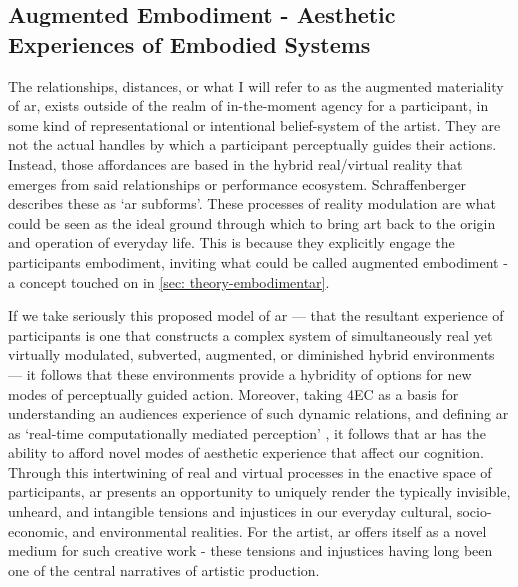 \subsection[Augmented Embodiment]{Augmented Embodiment - Aesthetic Experiences of Embodied Systems}\label{sec: discussion-medium-embodiment}
The relationships, distances, or what I will refer to as the augmented materiality of \gls{ar}, exists outside of the realm of in-the-moment agency for a participant, in some kind of representational or intentional belief-system of the artist. They are not the actual handles by which a participant perceptually guides their actions. Instead, those affordances are based in the hybrid real/virtual reality that emerges from said relationships or performance ecosystem. Schraffenberger describes these as `\gls{ar} subforms'. These processes of reality modulation are what could be seen as the ideal ground through which to bring art back to the origin and operation of everyday life. This is because they explicitly engage the participants embodiment, inviting what could be called augmented embodiment - a concept touched on in \autoref{sec: theory-embodimentar}.

If we take seriously this proposed model of \gls{ar} — that the resultant experience of participants is one that constructs a complex system of simultaneously real yet virtually modulated, subverted, augmented, or diminished hybrid environments — it follows that these environments provide a hybridity of options for new modes of perceptually guided action. Moreover, taking 4EC as a basis for understanding an audiences experience of such dynamic relations, and defining \gls{ar} as `real-time computationally mediated perception' \citep[]{chevalier2020}, it follows that \gls{ar} has the ability to afford novel modes of aesthetic experience that affect our cognition. Through this intertwining of real and virtual processes in the enactive space of participants, \gls{ar} presents an opportunity to uniquely render the typically invisible, unheard, and intangible tensions and injustices in our everyday cultural, socio-economic, and environmental realities. For the artist, \gls{ar} offers itself as a novel medium for such creative work - these tensions and injustices having long been one of the central narratives of artistic production.

